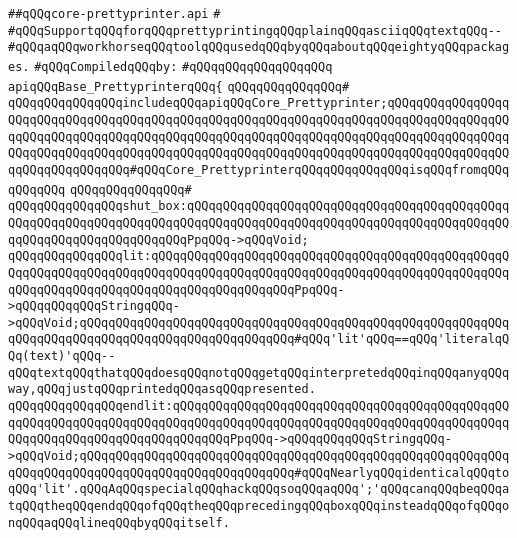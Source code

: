 \label{src/lib/prettyprint/big/src/base-prettyprinter.api}
\verb|##qQQqcore-prettyprinter.api|\newline
\verb|#|\newline
\verb|#qQQqSupportqQQqforqQQqprettyprintingqQQqplainqQQqasciiqQQqtextqQQq--|\newline
\verb|#qQQqaqQQqworkhorseqQQqtoolqQQqusedqQQqbyqQQqaboutqQQqeightyqQQqpackages.|\newline
\newline
\verb|#qQQqCompiledqQQqby:|\newline
\verb|#qQQqqQQqqQQqqQQqqQQq|\newline
\newline
\newline
\newline
\verb|apiqQQqBase_PrettyprinterqQQq{|\newline
\verb|qQQqqQQqqQQqqQQq#|\newline
\verb|qQQqqQQqqQQqqQQqincludeqQQqapiqQQqCore_Prettyprinter;qQQqqQQqqQQqqQQqqQQqqQQqqQQqqQQqqQQqqQQqqQQqqQQqqQQqqQQqqQQqqQQqqQQqqQQqqQQqqQQqqQQqqQQqqQQqqQQqqQQqqQQqqQQqqQQqqQQqqQQqqQQqqQQqqQQqqQQqqQQqqQQqqQQqqQQqqQQqqQQqqQQqqQQqqQQqqQQqqQQqqQQqqQQqqQQqqQQqqQQqqQQqqQQqqQQqqQQqqQQqqQQqqQQqqQQqqQQqqQQqqQQq#qQQqCore_PrettyprinterqQQqqQQqqQQqqQQqisqQQqfromqQQqqQQqqQQq|\newline
\verb|qQQqqQQqqQQqqQQq#|\newline
\verb|qQQqqQQqqQQqqQQqshut_box:qQQqqQQqqQQqqQQqqQQqqQQqqQQqqQQqqQQqqQQqqQQqqQQqqQQqqQQqqQQqqQQqqQQqqQQqqQQqqQQqqQQqqQQqqQQqqQQqqQQqqQQqqQQqqQQqqQQqqQQqqQQqqQQqqQQqqQQqqQQqPpqQQq->qQQqVoid;|\newline
\newline
\verb|qQQqqQQqqQQqqQQqlit:qQQqqQQqqQQqqQQqqQQqqQQqqQQqqQQqqQQqqQQqqQQqqQQqqQQqqQQqqQQqqQQqqQQqqQQqqQQqqQQqqQQqqQQqqQQqqQQqqQQqqQQqqQQqqQQqqQQqqQQqqQQqqQQqqQQqqQQqqQQqqQQqqQQqqQQqqQQqqQQqPpqQQq->qQQqqQQqqQQqStringqQQq->qQQqVoid;qQQqqQQqqQQqqQQqqQQqqQQqqQQqqQQqqQQqqQQqqQQqqQQqqQQqqQQqqQQqqQQqqQQqqQQqqQQqqQQqqQQqqQQqqQQqqQQqqQQq#qQQq'lit'qQQq==qQQq'literalqQQq(text)'qQQq--qQQqtextqQQqthatqQQqdoesqQQqnotqQQqgetqQQqinterpretedqQQqinqQQqanyqQQqway,qQQqjustqQQqprintedqQQqasqQQqpresented.|\newline
\verb|qQQqqQQqqQQqqQQqendlit:qQQqqQQqqQQqqQQqqQQqqQQqqQQqqQQqqQQqqQQqqQQqqQQqqQQqqQQqqQQqqQQqqQQqqQQqqQQqqQQqqQQqqQQqqQQqqQQqqQQqqQQqqQQqqQQqqQQqqQQqqQQqqQQqqQQqqQQqqQQqqQQqqQQqPpqQQq->qQQqqQQqqQQqStringqQQq->qQQqVoid;qQQqqQQqqQQqqQQqqQQqqQQqqQQqqQQqqQQqqQQqqQQqqQQqqQQqqQQqqQQqqQQqqQQqqQQqqQQqqQQqqQQqqQQqqQQqqQQqqQQq#qQQqNearlyqQQqidenticalqQQqtoqQQq'lit'.qQQqAqQQqspecialqQQqhackqQQqsoqQQqaqQQq';'qQQqcanqQQqbeqQQqatqQQqtheqQQqendqQQqofqQQqtheqQQqprecedingqQQqboxqQQqinsteadqQQqofqQQqonqQQqaqQQqlineqQQqbyqQQqitself.|\newline
